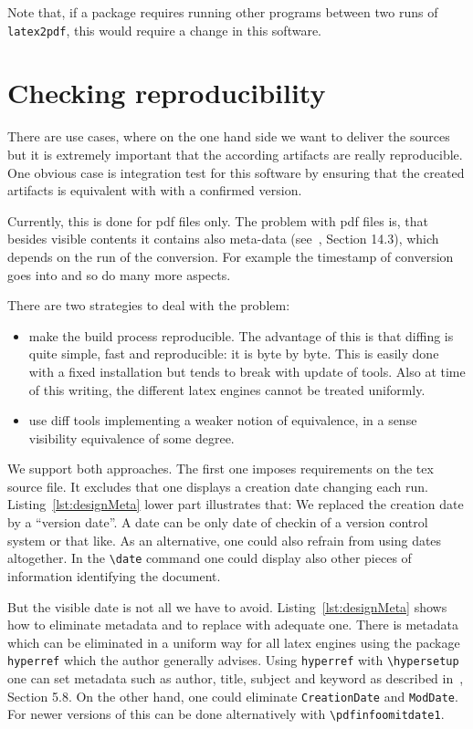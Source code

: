 Note that, if a package requires running other programs 
between two runs of \texttt{latex2pdf}, 
this would require a change in this software. 

\section{Checking reproducibility}\label{sec:chkReprod}

There are use cases, where on the one hand side we want to deliver the sources 
but it is extremely important that the according artifacts are really reproducible. 
One obvious case is integration test for this software 
by ensuring that the created artifacts 
is equivalent with with a confirmed version. 


Currently, this is done for pdf files only. 
The problem with pdf files is, that besides visible contents 
it contains also meta-data (see~\cite{pdf17}, Section 14.3), 
which depends on the run of the conversion. 
For example the timestamp of conversion goes into and so do many more aspects. 

There are two strategies to deal with the problem: 
%
\begin{itemize}
  \item 
  make the build process reproducible. 
  The advantage of this is that diffing is quite simple, fast and reproducible: 
  it is byte by byte. 
  This is easily done with a fixed installation but tends to break with update of tools. 
  Also at time of this writing, the different latex engines cannot be treated uniformly. 
  \item 
  use diff tools implementing a weaker notion of equivalence, 
  in a sense visibility equivalence of some degree. 
\end{itemize}

We support both approaches. 
The first one imposes requirements on the tex source file. 
It excludes that one displays a creation date changing each run. 
Listing~\ref{lst:designMeta} lower part illustrates that: 
We replaced the creation date by a ``version date''. 
A date can be only date of checkin of a version control system or that like. 
As an alternative, one could also refrain from using dates altogether. 
In the \texttt{\textbackslash date} command 
one could display also other pieces of information identifying the document. 

But the visible date is not all we have to avoid. 
Listing~\ref{lst:designMeta} shows how to eliminate metadata 
and to replace with adequate one. 
There is metadata which can be eliminated in a uniform way for all latex engines 
using the package \texttt{hyperref} which the author generally advises. 
Using \texttt{hyperref} with \texttt{\textbackslash hypersetup} 
one can set metadata such as author, title, subject and keyword 
as described in~\cite{HyperTextP}, Section 5.8. 
On the other hand, 
one could eliminate \texttt{CreationDate} and \texttt{ModDate}. 
For newer versions of \pdflatex{} this can be done alternatively 
with \texttt{\textbackslash pdfinfoomitdate1}. 

